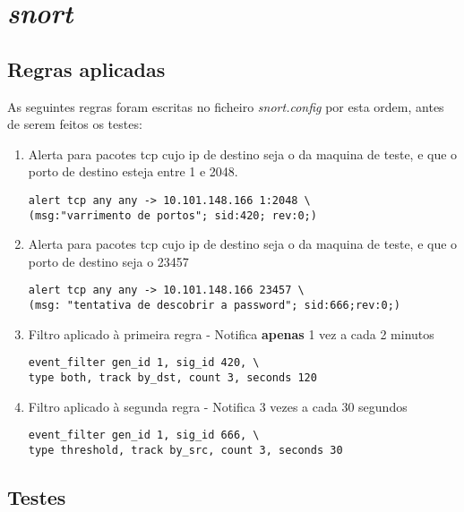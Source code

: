 \documentclass[12pt, a4paper, twoside]{report} %
\begin{document}
\chapter{\textit{snort}}

\section{Regras aplicadas}

As seguintes regras foram escritas no ficheiro \textit{snort.config} por esta ordem, antes de serem feitos os testes:

\begin{enumerate}

\item Alerta para pacotes tcp cujo ip de destino seja o da maquina de teste, e que o porto de destino esteja entre 1 e 2048.

\begin{lstlisting}
alert tcp any any -> 10.101.148.166 1:2048 \
(msg:"varrimento de portos"; sid:420; rev:0;)
\end{lstlisting}

\item Alerta para pacotes tcp cujo ip de destino seja o da maquina de teste, e que o porto de destino seja o 23457

\begin{lstlisting}
alert tcp any any -> 10.101.148.166 23457 \
(msg: "tentativa de descobrir a password"; sid:666;rev:0;)
\end{lstlisting}

\item Filtro aplicado à primeira regra - Notifica \textbf{apenas} 1 vez a cada 2 minutos

\begin{lstlisting}
event_filter gen_id 1, sig_id 420, \
type both, track by_dst, count 3, seconds 120
\end{lstlisting}

\item Filtro aplicado à segunda regra - Notifica 3 vezes a cada 30 segundos

\begin{lstlisting}
event_filter gen_id 1, sig_id 666, \
type threshold, track by_src, count 3, seconds 30
\end{lstlisting}

\end{enumerate}

\clearpage

\section{Testes}
\end{document}
